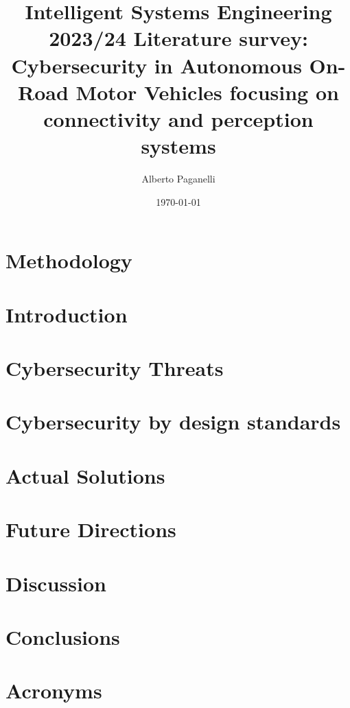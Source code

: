 \documentclass{scrartcl}
\title{\LARGE
Intelligent Systems Engineering 2023/24 \newline
\newline
Literature survey: \\
Cybersecurity in Autonomous On-Road Motor Vehicles focusing on connectivity and perception systems
}
\author{
    Alberto Paganelli \\ \emailaddr{alberto.paganelli3@studio.unibo.it}
}
\date{\today}
\begin{document}
    \maketitle
    \begin{abstract}
    
    \end{abstract}

    \newpage
    \tableofcontents
    \newpage

    \section{Methodology}\label{sec:methodology}
    

    \section{Introduction}\label{sec:introduction}
    

    \section{Cybersecurity Threats}\label{sec:cybersecurity-threats}
    

    \section{Cybersecurity by design standards}\label{sec:cybersecurity-by-design-standards}
    

    \section{Actual Solutions}\label{sec:actual-solutions}
    

    \section{Future Directions}\label{sec:future-directions}
    

    \section{Discussion}\label{sec:discussion}
    

    \section{Conclusions}\label{sec:conclusions}
    

    \section{Acronyms}\label{sec:acronyms}
    

    ~\nocite{*}
    
    
\end{document}
